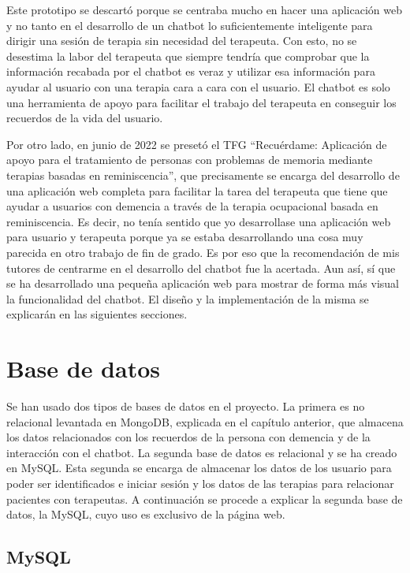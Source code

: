 Este prototipo se descartó porque se centraba mucho en hacer una aplicación web y no tanto en el desarrollo de un chatbot lo suficientemente inteligente para dirigir una sesión de terapia sin necesidad del terapeuta. Con esto, no se desestima la labor del terapeuta que siempre tendría que comprobar que la información recabada por el chatbot es veraz y utilizar esa información para ayudar al usuario con una terapia cara a cara con el usuario. El chatbot es solo una herramienta de apoyo para facilitar el trabajo del terapeuta en conseguir los recuerdos de la vida del usuario. 

Por otro lado, en junio de 2022 se presetó el TFG ``Recuérdame: Aplicación de apoyo para el tratamiento de personas con problemas de memoria mediante terapias basadas en reminiscencia'', que precisamente se encarga del desarrollo de una aplicación web completa para facilitar la tarea del terapeuta que tiene que ayudar a usuarios con demencia a través de la terapia ocupacional basada en reminiscencia. Es decir, no tenía sentido que yo desarrollase una aplicación web para usuario y terapeuta porque ya se estaba desarrollando una cosa muy parecida en otro trabajo de fin de grado. Es por eso que la recomendación de mis tutores de centrarme en el desarrollo del chatbot fue la acertada. Aun así, sí que se ha desarrollado una pequeña aplicación web para mostrar de forma más visual la funcionalidad del chatbot. El diseño y la implementación de la misma se explicarán en las siguientes secciones.


\section{Base de datos}

Se han usado dos tipos de bases de datos en el proyecto. La primera es no relacional levantada en MongoDB, explicada en el capítulo anterior, que almacena los datos relacionados con los recuerdos de la persona con demencia y de la interacción con el chatbot. La segunda base de datos es relacional y se ha creado en MySQL. Esta segunda se encarga de almacenar los datos de los usuario para poder ser identificados e iniciar sesión y los datos de las terapias para relacionar pacientes con terapeutas. A continuación se procede a explicar la segunda base de datos, la MySQL, cuyo uso es exclusivo de la página web. 

\subsection{MySQL}

